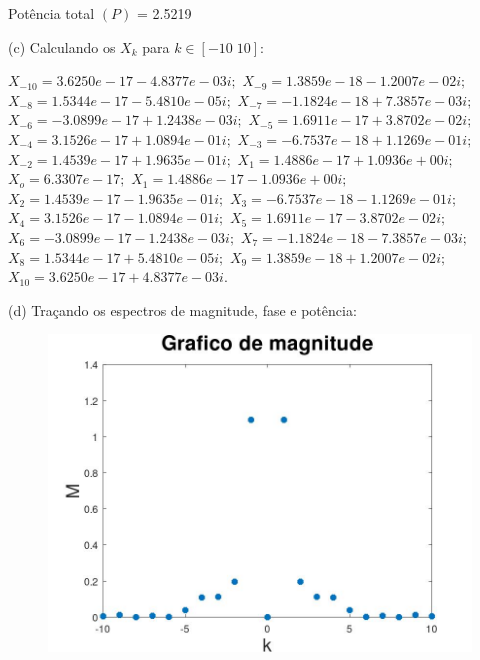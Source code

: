 \documentclass{article}
\begin{document}
Potência total $(P)$ = 2.5219

\vspace{\baselineskip}

(c) Calculando os $X_{k}$ para $k \in [-10\;10]$:

\vspace{\baselineskip}
$X_{-10} =  3.6250e-17 - 4.8377e-03i;$
$X_{-9} =  1.3859e-18 - 1.2007e-02i;$
$X_{-8} =  1.5344e-17 - 5.4810e-05i;$
$X_{-7} = -1.1824e-18 + 7.3857e-03i;$
$X_{-6} = -3.0899e-17 + 1.2438e-03i;$
$X_{-5} =  1.6911e-17 + 3.8702e-02i;$
$X_{-4} =  3.1526e-17 + 1.0894e-01i;$
$X_{-3} = -6.7537e-18 + 1.1269e-01i;$
$X_{-2} =  1.4539e-17 + 1.9635e-01i;$
$X_{1} =  1.4886e-17 + 1.0936e+00i;$
$X_{o} = 6.3307e-17;$
$X_{1} =  1.4886e-17 - 1.0936e+00i;$
$X_{2} =  1.4539e-17 - 1.9635e-01i;$
$X_{3} = -6.7537e-18 - 1.1269e-01i;$
$X_{4} =  3.1526e-17 - 1.0894e-01i;$
$X_{5} =  1.6911e-17 - 3.8702e-02i;$
$X_{6} = -3.0899e-17 - 1.2438e-03i;$
$X_{7} = -1.1824e-18 - 7.3857e-03i;$
$X_{8} =  1.5344e-17 + 5.4810e-05i;$
$X_{9} =  1.3859e-18 + 1.2007e-02i;$
$X_{10} =  3.6250e-17 + 4.8377e-03i.$

\vspace{\baselineskip}

(d) Traçando os espectros de magnitude, fase e potência:

\vspace{\baselineskip}

\begin{figure}[h!]
    \includegraphics[scale=0.3]{plot4dm}
    \centering
\end{figure}

\vspace{\baselineskip}
\end{document}
